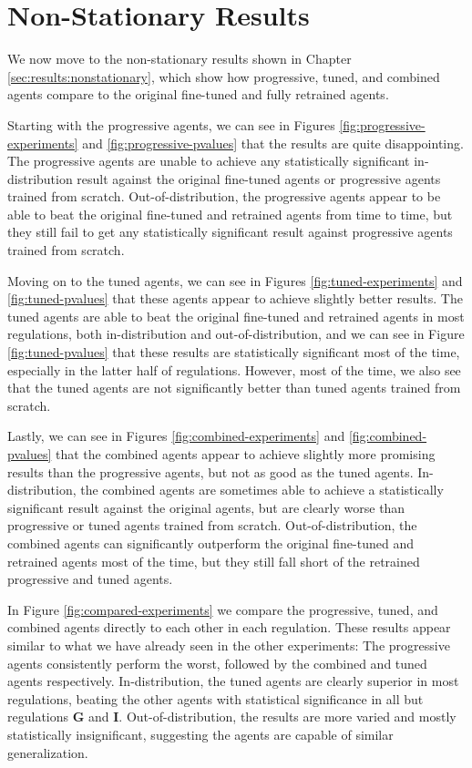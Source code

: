 \section{Non-Stationary Results} \label{sec:discussion:nonstationary}
We now move to the non-stationary results shown in Chapter \ref{sec:results:nonstationary}, which show how progressive, tuned, and combined agents compare to the original fine-tuned and fully retrained agents.

Starting with the progressive agents, we can see in Figures \ref{fig:progressive-experiments} and \ref{fig:progressive-pvalues} that the results are quite disappointing.
The progressive agents are unable to achieve any statistically significant in-distribution result against the original fine-tuned agents or progressive agents trained from scratch.
Out-of-distribution, the progressive agents appear to be able to beat the original fine-tuned and retrained agents from time to time, but they still fail to get any statistically significant result against progressive agents trained from scratch.

Moving on to the tuned agents, we can see in Figures \ref{fig:tuned-experiments} and \ref{fig:tuned-pvalues} that these agents appear to achieve slightly better results.
The tuned agents are able to beat the original fine-tuned and retrained agents in most regulations, both in-distribution and out-of-distribution, and we can see in Figure \ref{fig:tuned-pvalues} that these results are statistically significant most of the time, especially in the latter half of regulations.
However, most of the time, we also see that the tuned agents are not significantly better than tuned agents trained from scratch.

Lastly, we can see in Figures \ref{fig:combined-experiments} and \ref{fig:combined-pvalues} that the combined agents appear to achieve slightly more promising results than the progressive agents, but not as good as the tuned agents.
In-distribution, the combined agents are sometimes able to achieve a statistically significant result against the original agents, but are clearly worse than progressive or tuned agents trained from scratch.
Out-of-distribution, the combined agents can significantly outperform the original fine-tuned and retrained agents most of the time, but they still fall short of the retrained progressive and tuned agents.

In Figure \ref{fig:compared-experiments} we compare the progressive, tuned, and combined agents directly to each other in each regulation.
These results appear similar to what we have already seen in the other experiments: The progressive agents consistently perform the worst, followed by the combined and tuned agents respectively.
In-distribution, the tuned agents are clearly superior in most regulations, beating the other agents with statistical significance in all but regulations \textbf{G} and \textbf{I}.
Out-of-distribution, the results are more varied and mostly statistically insignificant, suggesting the agents are capable of similar generalization.

